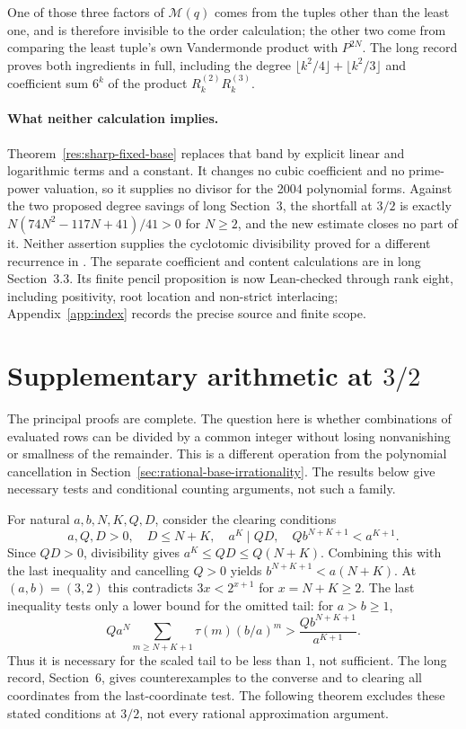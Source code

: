 \documentclass[11pt]{article}
\begin{document}
One of those three factors of $\mathcal M(q)$ comes from the tuples other than
the least one, and is therefore invisible to the order calculation; the other
two come from comparing the least tuple's own Vandermonde product with
$P^{2N}$. The long record proves both ingredients in full, including the degree
$\lfloor k^2/4\rfloor+\lfloor k^2/3\rfloor$ and coefficient sum $6^k$ of the
product $R_k^{(2)}R_k^{(3)}$.

\paragraph{What neither calculation implies.}
Theorem~\ref{res:sharp-fixed-base} replaces that band by explicit linear
and logarithmic terms and a constant. It changes no cubic coefficient and no
prime-power valuation, so it supplies no divisor for the 2004 polynomial forms.
Against the two proposed degree savings of long Section~3, the shortfall at
$3/2$ is exactly $N(74N^2-117N+41)/41>0$ for $N\ge2$, and the new estimate
closes no part of it. Neither assertion supplies the cyclotomic divisibility proved
for a different recurrence in \cite[Prop.~4, pp.~14--15]{krvz2009}.
The separate coefficient and content calculations are in long
Section~3.3. Its finite pencil proposition is now Lean-checked through
rank eight, including positivity, root location and non-strict interlacing;
Appendix~\ref{app:index} records the precise source and finite scope.

\section{Supplementary arithmetic at \texorpdfstring{$3/2$}{3/2}}
\label{sec:open}

The principal proofs are complete. The question here is whether
combinations of evaluated rows can be divided by a common integer
without losing nonvanishing or smallness of the remainder.
This is a different operation from the polynomial cancellation in
Section~\ref{sec:rational-base-irrationality}. The results below give
necessary tests and conditional counting arguments, not such a family.

For natural $a,b,N,K,Q,D$, consider the clearing conditions
\[
 a,Q,D>0,\quad D\le N+K,\quad a^K\mid QD,
 \quad Qb^{N+K+1}<a^{K+1}.
\]
Since $QD>0$, divisibility gives $a^K\le QD\le Q(N+K)$.
Combining this with the last inequality and cancelling $Q>0$ yields
$b^{N+K+1}<a(N+K)$. At $(a,b)=(3,2)$ this contradicts
$3x<2^{x+1}$ for $x=N+K\ge2$.
The last inequality tests only a lower bound for the omitted tail: for
$a>b\ge1$,
\[
 Q a^N\sum_{m\ge N+K+1}\tau(m)(b/a)^m
 >\frac{Qb^{N+K+1}}{a^{K+1}}.
\]
Thus it is necessary for the scaled tail to be less than $1$, not
sufficient. The long record, Section~6, gives counterexamples to the
converse and to clearing all coordinates from the last-coordinate
test. The following theorem excludes these stated conditions at
$3/2$, not every rational approximation argument.
\end{document}
